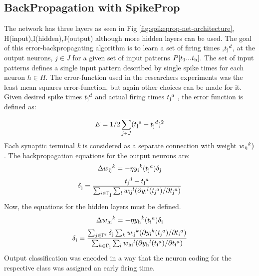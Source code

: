 \documentclass[12pt]{report}
\begin{document}
\subsection{BackPropagation with SpikeProp}
The network has three layers as seen in Fig \ref{fig:spikeprop-net-architecture}, H(input),I(hidden),J(output) although more hidden layers can be used. The goal of this error-backpropagating algorithm is to learn a set of firing times ,{\(t\textsubscript{j}^d\)}, at the output neurons, {\(j\in J\)} for a given set of input patterns {\(P[t\textsubscript{1}...t\textsubscript{h}]\)}. The set of input patterns defines a single input pattern described by single spike times for each neuron  {\(h\in H\)}. The error-function used in the researchers experiments was  the least mean squares error-function, but again other choices can be made for it. Given desired spike
times {\(t\textsubscript{j}^d\)} and actual firing times {\(t\textsubscript{j}^a\)} , the error function is defined as:

\begin{equation}
    E=1/2\sum_{j\in J}(t\textsubscript{j}^a-t\textsubscript{j}^d)^2
\end{equation}
Each synaptic terminal \textit{k} is considered as a separate connection with weight \(w\textsubscript{ij}^k)\). The backpropagation equations for the output neurons are:
\begin{equation}
    \Delta w\textsubscript{ij}^k=-\eta y\textsubscript{i}^k (t\textsubscript{j}^a) \delta \textsubscript{j}
\end{equation}
\begin{equation}
\delta \textsubscript{j} = \frac { t\textsubscript{j}^d-t\textsubscript{j}^a}  {\sum_{i \in \Gamma \textsubscript{j} } \sum_{l} w \textsubscript{ij}^l(\partial y \textsubscript{i}^l(t \textsubscript{j}^a) / \partial t \textsubscript{j}^a)}
\end{equation}
Now, the equations for the hidden layers must be defined.
\begin{equation}
    \Delta w\textsubscript{hi}^k=-\eta y\textsubscript{h}^k (t\textsubscript{i}^a) \delta \textsubscript{i}
\end{equation}
\begin{equation}
\delta \textsubscript{i} = \frac { \sum_{j \in \Gamma^i  }\delta\textsubscript{j}\sum_{k} w \textsubscript{ij}^k(\partial y \textsubscript{i}^k(t \textsubscript{j}^a) / \partial t \textsubscript{i}^a)}
{ \sum_{h \in \Gamma \textsubscript{i} }\sum_{l} w \textsubscript{hi}^l(\partial y \textsubscript{h}^l(t \textsubscript{i}^a) / \partial t \textsubscript{i}^a)}
\end{equation}
Output classification was encoded in a way that the neuron coding for the respective class was assigned an early firing time. 
\end{document}
